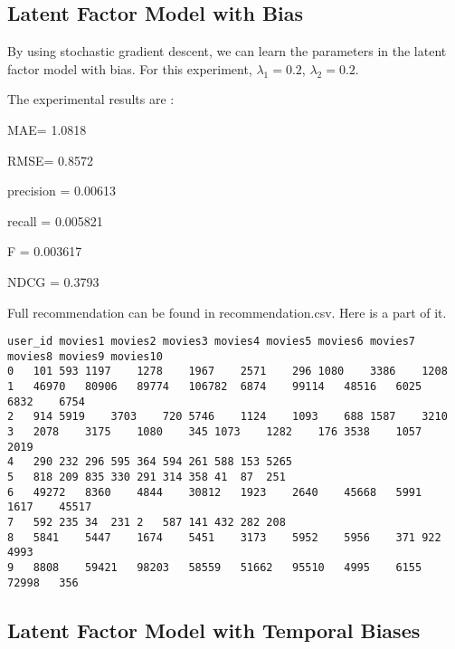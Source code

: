 \documentclass[sigconf]{acmart}
\begin{document}
\subsection{Latent Factor Model with Bias}
By using stochastic gradient descent, we can learn the parameters in the latent factor model with bias. For this experiment, $\lambda_1 = 0.2$, $\lambda_2 = 0.2$.

\item{The experimental results are :}
\item{MAE= 1.0818}
\item{RMSE= 0.8572}
\item{precision = 0.00613}
\item{recall = 0.005821}
\item{F = 0.003617}
\item{NDCG = 0.3793}


Full recommendation can be found in recommendation.csv. Here is a part of it.
\begin{lstlisting}
user_id	movies1	movies2	movies3	movies4	movies5	movies6	movies7	movies8	movies9	movies10
0	101	593	1197	1278	1967	2571	296	1080	3386	1208
1	46970	80906	89774	106782	6874	99114	48516	6025	6832	6754
2	914	5919	3703	720	5746	1124	1093	688	1587	3210
3	2078	3175	1080	345	1073	1282	176	3538	1057	2019
4	290	232	296	595	364	594	261	588	153	5265
5	818	209	835	330	291	314	358	41	87	251
6	49272	8360	4844	30812	1923	2640	45668	5991	1617	45517
7	592	235	34	231	2	587	141	432	282	208
8	5841	5447	1674	5451	3173	5952	5956	371	922	4993
9	8808	59421	98203	58559	51662	95510	4995	6155	72998	356
\end{lstlisting}


\subsection{Latent Factor Model with Temporal Biases}
\end{document}
